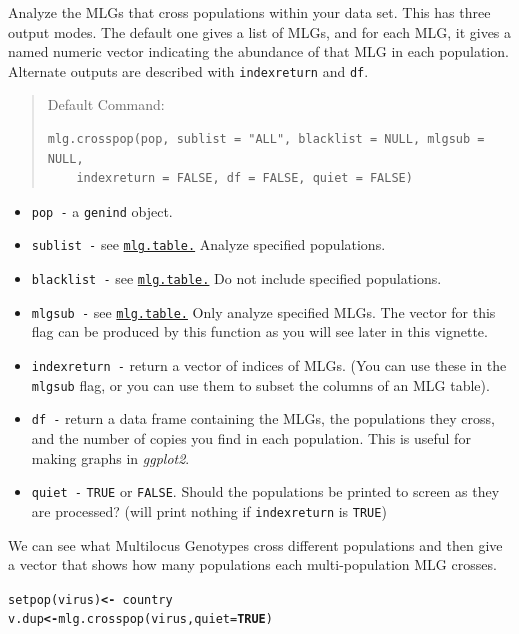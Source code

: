 \documentclass[letterpaper]{article}\usepackage[]{graphicx}\usepackage[]{color}
\makeatletter
\newcommand{\hlnum}[1]{\textcolor[rgb]{0.502,0,0.502}{\textbf{#1}}}%
\newcommand{\hlopt}[1]{\textcolor[rgb]{1,0,0.502}{\textbf{#1}}}%
\newcommand{\hlstd}[1]{\textcolor[rgb]{0,0,0}{#1}}%
\newcommand{\hlkwb}[1]{\textcolor[rgb]{0.502,0.502,0.753}{\textbf{#1}}}%
\newcommand{\hlkwc}[1]{\textcolor[rgb]{0,0.502,0.753}{#1}}%
\newcommand{\hlkwd}[1]{\textcolor[rgb]{0,0.267,0.4}{#1}}%
\newenvironment{kframe}{%
 \def\at@end@of@kframe{}%
 \ifinner\ifhmode%
  \def\at@end@of@kframe{\end{minipage}}%
  \begin{minipage}{\columnwidth}%
 \fi\fi%
 \def\FrameCommand##1{\hskip\@totalleftmargin \hskip-\fboxsep
 \colorbox{shadecolor}{##1}\hskip-\fboxsep
     \hskip-\linewidth \hskip-\@totalleftmargin \hskip\columnwidth}%
 \MakeFramed {\advance\hsize-\width
   \@totalleftmargin\z@ \linewidth\hsize
   \@setminipage}}%
 {\par\unskip\endMakeFramed%
 \at@end@of@kframe}
\newenvironment{knitrout}{}{} %
\newcommand{\tab}{\hspace*{1em}}
\newcommand{\cmdlink}[2]{
  \texttt{\hyperref[#1]{#2}}
}
\makeatother
\begin{document}
\tab\tab Analyze the MLGs that cross populations within your data set. This has three output modes. The default one gives a list of MLGs, and for each MLG, it gives a named numeric vector indicating the abundance of that MLG in each population. Alternate outputs are described with \texttt{indexreturn} and \texttt{df}.
\begin{quote}
Default Command:
\begin{knitrout}
\color{fgcolor}\begin{kframe}
\begin{verbatim}
mlg.crosspop(pop, sublist = "ALL", blacklist = NULL, mlgsub = NULL, 
    indexreturn = FALSE, df = FALSE, quiet = FALSE)
\end{verbatim}
\end{kframe}
\end{knitrout}

\end{quote}
  \begin{itemize}
    \item \texttt{pop -} a \texttt{genind} object.
    \item \texttt{sublist -} see\cmdlink{mlg:table:mlg.table}{mlg.table.}Analyze specified populations.
    \item \texttt{blacklist -} see\cmdlink{mlg:table:mlg.table}{mlg.table.}Do not include specified populations.
    \item \texttt{mlgsub -} see\cmdlink{mlg:table:mlg.table}{mlg.table.}Only analyze specified MLGs. The vector for this flag can be produced by this function as you will see later in this vignette.
    \item \texttt{indexreturn -} return a vector of indices of MLGs. (You can use these in the \texttt{mlgsub} flag, or you can use them to subset the columns of an MLG table). 
    \item \texttt{df -} return a data frame containing the MLGs, the populations they cross, and the number of copies you find in each population. This is useful for making graphs in \textit{ggplot2}.
    \item \texttt{quiet -} \texttt{TRUE} or \texttt{FALSE}. Should the populations be printed to screen as they are processed? (will print nothing if \texttt{indexreturn} is \texttt{TRUE})
  \end{itemize}
  
We can see what Multilocus Genotypes cross different populations and then give a vector that shows how many populations each multi-population MLG crosses.
\begin{knitrout}\footnotesize
{}\color{fgcolor}\begin{kframe}
\begin{alltt}
\hlkwd{setpop}\hlstd{(virus)} \hlkwb{<-} \hlopt{~}\hlstd{country}
\hlstd{v.dup} \hlkwb{<-} \hlkwd{mlg.crosspop}\hlstd{(virus,} \hlkwc{quiet} \hlstd{=} \hlnum{TRUE}\hlstd{)}
\end{alltt}
\end{kframe}
\end{knitrout}
\end{document}
